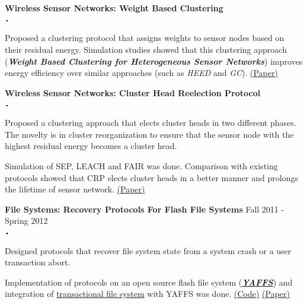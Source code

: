 \documentclass{article}
\newcommand{\sbt}{\,\begin{picture}(-1,1)(-1,-3)\circle*{2}\end{picture}\ }
\newcommand{\project}[2]{{ \textbf{#1} \hfill #2\\  }}
\newenvironment{achievements}{\begin{list}{$\sbt$}{\topsep -2pt \itemsep -2pt}}{\vspace*{0pt}\end{list}}
\begin{document}
\project{Wireless Sensor Networks: Weight Based Clustering}{}
	\begin{achievements}
	\item  Proposed a clustering protocol that assigns weights to sensor nodes based on their residual energy. Simulation studies showed that this clustering approach ({\bf{\emph{Weight Based Clustering for Heterogeneous Sensor Networks}}}) improves energy efficiency over similar approaches (such as \textit{HEED} and \textit{GC}).
	\href{http://ieeexplore.ieee.org/xpls/abs_all.jsp?arnumber=6488034}{(Paper)}
	\end{achievements}
\vspace{3mm}	
\project{Wireless Sensor Networks: Cluster Head Reelection Protocol}{}
	\begin{achievements}
	\item  Proposed a clustering approach that elects cluster heads in two different phases. The novelty is in cluster reorganization to ensure that the sensor node with the highest residual energy becomes a cluster head.
	\item Simulation of SEP, LEACH and FAIR was done. Comparison with existing protocols showed that CRP elects cluster heads in a better manner and prolongs the lifetime of sensor network.
	\href{http://ieeexplore.ieee.org/xpls/abs_all.jsp?arnumber=6465561}{(Paper)}
	\end{achievements}
\vspace{3mm}	

\project{File Systems: Recovery Protocols For Flash File Systems}{Fall 2011 - Spring 2012}
	\begin{achievements}
	\item Designed protocols that recover file system state from a system crash or a user transaction abort.
	\item Implementation of protocols on an open source flash file system (\href{http://www.yaffs.net/}{\bf{\emph{YAFFS}}}) and integration of \href{http://dl.acm.org/citation.cfm?id=1851276.1851285}{transactional file system} with YAFFS was done.
	\href{https://github.com/ravifreek63/YAFFS_repo}{(Code)}
	\href{http://link.springer.com/chapter/10.1007\%2F978-3-642-36071-8_41#page-1}{(Paper)}
	\end{achievements}
\vspace{3mm}  
\end{document}
